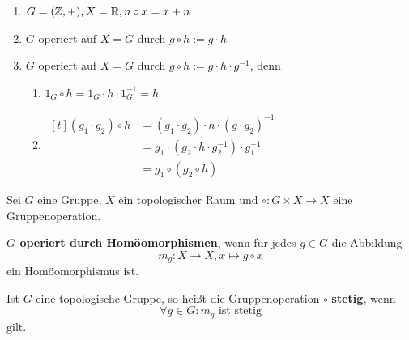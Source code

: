 \begin{beispiel}
    \begin{enumerate}[label=\arabic*),ref=\thebeispiel.\arabic*]
        \item $G = (\mathbb{Z}, +), X = \mathbb{R}, n \circ x = x + n$\label{bsp:gruppenoperation1}
        \item $G$ operiert auf $X = G$ durch $g \circ h := g \cdot h$
        \item $G$ operiert auf $X = G$ durch $g \circ h := g \cdot h \cdot g^{-1}$, denn
        \begin{enumerate}[label=\roman*)]
            \item $1_G \circ h = 1_G \cdot h \cdot 1_G^{-1} = h$
            \item $\!\begin{aligned}[t]
                    (g_1 \cdot g_2) \circ h &= (g_1 \cdot g_2) \cdot h \cdot (g \cdot g_2)^{-1}\\
                        &= g_1 \cdot (g_2 \cdot h \cdot g_2^{-1}) \cdot g_1^{-1}\\
                        &= g_1 \circ (g_2 \circ h)
                  \end{aligned}$
        \end{enumerate}
    \end{enumerate}
\end{beispiel}

\begin{definition}
    Sei $G$ eine Gruppe, $X$ ein topologischer Raum und
    $\circ: G \times X \rightarrow X$ eine Gruppenoperation.

    \begin{defenum}
        \item {}\textbf{$G$ operiert durch Homöomorphismen}, wenn für jedes $g \in G$
              die Abbildung
              \[m_g: X \rightarrow X, x \mapsto g \circ x\]
              ein Homöomorphismus ist.
        \item Ist $G$ eine topologische Gruppe, so heißt die Gruppenoperation $\circ$
              \textbf{stetig}, wenn 
              \[\forall g \in G: m_g \text{ ist stetig}\]
              gilt.
    \end{defenum}
\end{definition}

